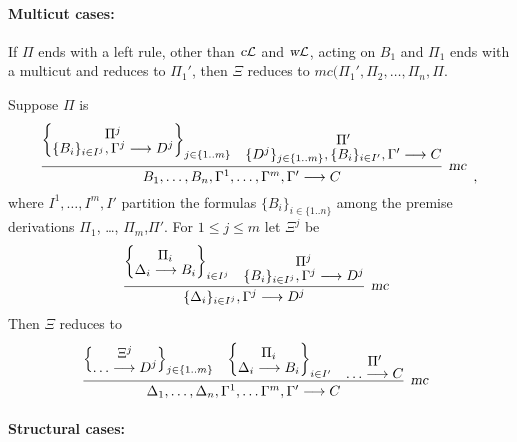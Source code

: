 \documentclass[preprint]{elsarticle}
\newcommand{\Seq}[2]{#1\longrightarrow #2}
\newcommand{\cL}{\hbox{\sl c}{\cal L}}
\newcommand{\circL}{\circ{\cal L}}
\newcommand{\mc}{\hbox{\sl mc}}
\newcommand{\wL}{\hbox{\sl w}{\cal L}}
\begin{document}
\paragraph{Multicut cases:}

\begin{trivlist}

\item[\fbox{$\mc/\circL$}] If $\Pi$ ends with a left rule, other than $\cL$ and
  $\wL$, acting on $B_1$ and $\Pi_1$ ends with a multicut
  and reduces to $\Pi_1'$, then $\Xi$ reduces to $mc(\Pi_1',\Pi_2,\ldots,\Pi_n,\Pi$.


\item[\fbox{$-/\mc$}] Suppose $\Pi$ is
  \begin{displaymath}
    \infer[\mc]{\Seq{B_1,\ldots,B_n,\Gamma^1,\ldots,\Gamma^m,\Gamma'}{C}}
    {\left\{\raisebox{-1.5ex}{\deduce{\Seq{\{B_i\}_{i \in I^j},\Gamma^j}{D^j}}
          {\Pi^j}}\right\}_{j \in \{1..m\}}
      & \raisebox{-2.5ex}{\deduce{\Seq{\{D^j\}_{j \in \{1..m\}},\{B_i\}_{i \in I'},\Gamma'}{C}}
        {\Pi'}}}
    \enspace ,
  \end{displaymath}
  where $I^1,\ldots,I^m,I'$ partition the formulas $\{B_i\}_{i \in
    \{1..n\}}$ among the premise derivations $\Pi_1$, \ldots,
  $\Pi_m$,$\Pi'$.  For $1 \leq j \leq m$ let $\Xi^j$ be
  \begin{displaymath}
    \infer[\mc]{\Seq{\{\Delta_i\}_{i \in I^j},\Gamma^j}{D^j}}
    {\left\{\raisebox{-1.5ex}{\deduce{\Seq{\Delta_i}{B_i}}
          {\Pi_i}}\right\}_{i \in I^j}
      & \raisebox{-2.5ex}{\deduce{\Seq{\{B_i\}_{i \in I^j},\Gamma^j}{D^j}}
        {\Pi^j}}}
    \enspace 
  \end{displaymath}
  Then $\Xi$ reduces to
  \begin{displaymath}
    \infer[\mc]{\Seq{\Delta_1,\ldots,\Delta_n,\Gamma^1,\ldots\Gamma^m,\Gamma'}{C}}
    {\left\{\raisebox{-1.5ex}{\deduce{\Seq{\ldots}{D^j}}
          {\Xi^j}}\right\}_{j \in \{1..m\}}
      & \left\{\raisebox{-1.5ex}{\deduce{\Seq{\Delta_i}{B_i}}
          {\Pi_i}}\right\}_{i \in I'}
      & \raisebox{-2.5ex}{\deduce{\Seq{\ldots}{C}}
        {\Pi'}}}
    \enspace 
  \end{displaymath}

\end{trivlist}

\paragraph{Structural cases:}
\end{document}
